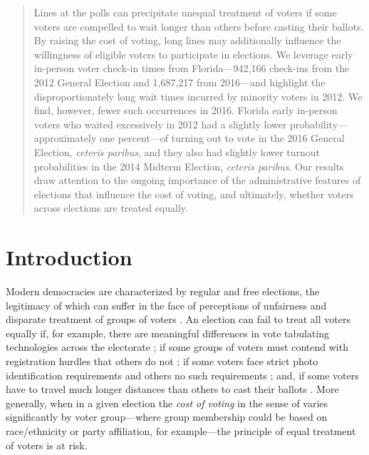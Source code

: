 \documentclass[12pt,titlepage]{article}
\begin{document}
\begin{abstract}
  \noindent 
  Lines at the polls can precipitate unequal treatment of voters if
  some voters are compelled to wait longer than others before casting
  their ballots. By raising the cost of voting, long lines may
  additionally influence the willingness of eligible voters to
  participate in elections.  We leverage early in-person voter
  check-in times from Florida---942,166 check-ins from the 2012
  General Election and 1,687,217 from 2016---and highlight the
  disproportionately long wait times incurred by minority voters in
  2012. We find, however, fewer such occurrences in 2016.  Florida
  early in-person voters who waited excessively in 2012 had a slightly
  lower probability---approximately one percent---of turning out to
  vote in the 2016 General Election, \emph{ceteris paribus}, and they
  also had slightly lower turnout probabilities in the 2014 Midterm
  Election, \emph{ceteris paribus}.  Our results draw attention to the
  ongoing importance of the administrative features of elections that
  influence the cost of voting, and ultimately, whether voters across
  elections are treated equally.
\end{abstract}



\newpage
\section*{Introduction}

Modern democracies are characterized by regular and free elections,
the legitimacy of which can suffer in the face of perceptions of
unfairness and disparate treatment of groups of voters
\citep{norris2014electoral}.  An election can fail to treat all voters
equally if, for example, there are meaningful differences in vote
tabulating technologies across the electorate
\citep[e.g.,][]{kimballkropf:tech}; if some groups of voters must
contend with registration hurdles that others do not
\cite[e.g.,][]{ansolhersh:registration}; if some voters face strict
photo identification requirements and others no such requirements
\citep[e.g.,][]{benteleetal:newjimcrow}; and, if some voters have to
travel much longer distances than others to cast their ballots
\citep[e.g.,][]{dyckgimpel:distance}.  More generally, when in a given
election the \emph{cost of voting} in the sense of
\cite{downs:econtheory} varies significantly by voter group---where
group membership could be based on race/ethnicity or party
affiliation, for example---the principle of equal treatment of voters
is at risk.
\end{document}
